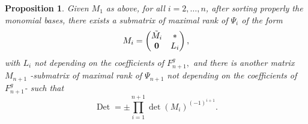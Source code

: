 \documentclass[a4paper,11pt]{amsart}
\newcommand{\Det}{\operatorname{Det}}
\newcounter{thm}
\numberwithin{thm}{section}
\numberwithin{equation}{section}
\theoremstyle{definition}
\theoremstyle{plain}
\newtheorem{proposition}[thm]{Proposition}
\begin{document}
\begin{proposition}\label{lab}
Given $M_1$ as above, for all $i=2,\ldots, n$, after sorting properly the monomial bases, there exists a submatrix of maximal rank of $\Psi_{i}$ of the form
$$M_i=\begin{pmatrix}
\tilde{M}_i& *\\
{\bf0}& L_i
\end{pmatrix},
$$
with $L_i$ not depending on the coefficients of $F^g_{n+1},$ and  there is another matrix $M_{n+1}$ -submatrix of maximal rank of $\Psi_{n+1}$ not depending on the coefficients of $F^g_{n+1}$- such that
\begin{equation}\label{det}
\Det =\pm\prod_{i=1}^{n+1} \det(M_i)^{(-1)^{i+1}}.
\end{equation}
\end{proposition}
\end{document}

